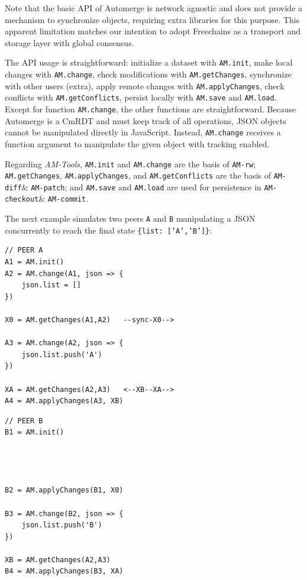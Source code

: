 \documentclass[12pt]{article}
\newcommand{\AMT}      {\emph{AM-Tools}\xspace}
\newcommand{\code}[1]  {\texttt{\footnotesize{#1}}}
\newcommand{\amrw}       {\texttt{AM-rw}\xspace}
\newcommand{\amdiff}     {\texttt{AM-diff}\xspace}
\newcommand{\ampatch}    {\texttt{AM-patch}\xspace}
\newcommand{\amcheckout} {\texttt{AM-checkout}\xspace}
\newcommand{\amcommit}   {\texttt{AM-commit}\xspace}
\begin{document}
Note that the basic API of Automerge is network agnostic and does not provide
a mechanism to synchronize objects, requiring extra libraries for this purpose.
%
This apparent limitation matches our intention to adopt Freechains as a
transport and storage layer with global consensus.

The API usage is straightforward:
    initialize a dataset with \code{AM.init},
    make local changes with \code{AM.change},
    check modifications with \code{AM.getChanges},
    synchronize with other users (extra),
    apply remote changes with \code{AM.applyChanges},
    check conflicts with \code{AM.getConflicts},
    persist locally with \code{AM.save} and \code{AM.load}.
Except for function \code{AM.change}, the other functions are straightforward.
%
Because Automerge is a CmRDT and must keep track of all operations, JSON
objects cannot be manipulated directly in JavaScript.
Instead, \code{AM.change} receives a function argument to manipulate
the given object with tracking enabled.

Regarding \AMT,
    \code{AM.init} and \code{AM.change} are the basis of \amrw;
    \code{AM.getChanges}, \code{AM.applyChanges}, and \code{AM.getConflicts}
    are the basis of \amdiff \& \ampatch; and
    \code{AM.save} and \code{AM.load} are used for persistence in
    \amcheckout \& \amcommit.

The next example simulates two peers \code{A} and \code{B} manipulating a
JSON concurrently to reach the final state \code{\{list:~['A','B']\}}:

\noindent
{\footnotesize
\begin{minipage}[t]{0.6\textwidth}
\begin{verbatim}
// PEER A
A1 = AM.init()
A2 = AM.change(A1, json => {
    json.list = []
})

X0 = AM.getChanges(A1,A2)   --sync-X0-->

A3 = AM.change(A2, json => {
    json.list.push('A')
})

XA = AM.getChanges(A2,A3)   <--XB--XA-->
A4 = AM.applyChanges(A3, XB)
\end{verbatim}
\end{minipage}
\begin{minipage}[t]{0.4\textwidth}
\begin{verbatim}
// PEER B
B1 = AM.init()




B2 = AM.applyChanges(B1, X0)

B3 = AM.change(B2, json => {
    json.list.push('B')
})

XB = AM.getChanges(A2,A3)
B4 = AM.applyChanges(B3, XA)
\end{verbatim}
\end{minipage}
}
\end{document}
